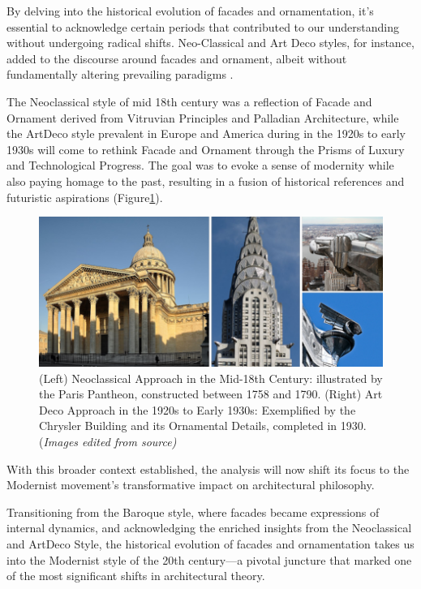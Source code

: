 
By delving into the historical evolution of facades and ornamentation, it's essential to acknowledge certain periods that contributed to our understanding without undergoing radical shifts.
Neo-Classical and Art Deco styles, for instance, added to the discourse around facades and ornament, albeit without fundamentally altering prevailing paradigms .

The Neoclassical style of mid 18th century was a reflection of Facade and Ornament derived from Vitruvian Principles and Palladian Architecture, while the ArtDeco style prevalent in Europe and America during in the 1920s to early 1930s will come to rethink Facade and Ornament through the Prisms of Luxury and Technological Progress.
The goal was to evoke a sense of modernity while also paying homage to the past, resulting in a fusion of historical references and futuristic aspirations (Figure\ref{fig:NeoclassicArtDeco}).

     \begin{figure}[htb]
          \centering
          \includegraphics[width= \linewidth]{Images/NeoclassicArtDeco}
          \caption{(Left) Neoclassical Approach in the Mid-18th Century: illustrated by the Paris Pantheon, constructed between 1758 and 1790. (Right) Art Deco Approach in the 1920s to Early 1930s: Exemplified by the Chrysler Building and its Ornamental Details, completed in 1930. (\textit{Images edited from source)}}
          \label{fig:NeoclassicArtDeco}
        \end{figure}

With this broader context established, the analysis will now shift its focus to the Modernist movement's transformative impact on architectural philosophy.


Transitioning from the Baroque style, where facades became expressions of internal dynamics, and acknowledging the enriched insights from the Neoclassical and ArtDeco Style,  the historical evolution of facades and ornamentation takes us into the Modernist style of the 20th century—a pivotal juncture that marked one of the most significant shifts in architectural theory.

